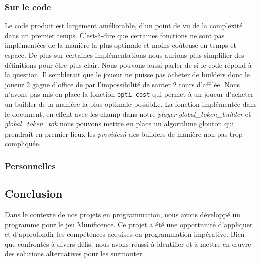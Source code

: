 \documentclass{article}
\begin{document}
\subsubsection{Sur le code}
\hspace{1em} Le code produit est largement améliorable, d'un point de vu de la complexité dans un premier temps. C'est-à-dire que certaines fonctions ne sont pas implémentées de la manière la plus optimale et moins coûteuse en temps et espace. De plus sur certaines implémentations nous aurions plus simplifier des définitions pour être plus clair. Nous pouvons aussi parler de si le code répond à la question. Il semblerait que le joueur ne puisse pas acheter de builders donc le joueur 2  gagne d'office de par l'impossibilité de sauter 2 tours d'affilée. 
Nous n'avons pas mis en place la fonction \texttt{opti\_cost} qui permet à un joueur d'acheter un builder de la manière la plus optimale possibLe. La fonction implémentée dans le document, en effent avec les champ dans notre \emph{player} \emph{global\_token\_builder} et \emph{global\_token\_tok} nous pouvons mettre en place un algorithme glouton qui prendrait en premier lieux les \emph{provides\.n} des builders de manière non pas trop compliquée. 

\subsubsection{Personnelles}
\subsection{Conclusion}
\hspace{1.5em}Dans le contexte de nos projets en programmation, nous avons développé un programme pour le jeu Munificence. Ce projet a été une opportunité d'appliquer et d'approfondir les compétences acquises en programmation impérative. Bien que confrontés à divers défis, nous avons réussi à identifier et à mettre en œuvre des solutions alternatives pour les surmonter.
\end{document}
